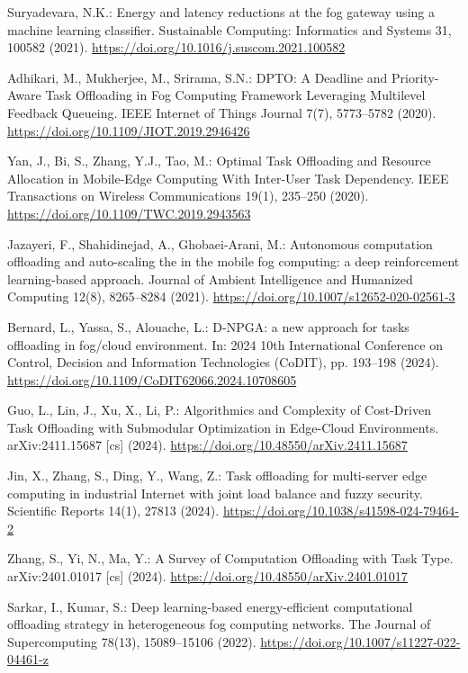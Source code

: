 \documentclass{svproc}
\begin{document}
\begin{thebibliography}{99}
Suryadevara, N.K.: Energy and latency reductions at the fog gateway using a machine learning classifier. Sustainable Computing: Informatics and Systems 31, 100582 (2021). \url{https://doi.org/10.1016/j.suscom.2021.100582}

Adhikari, M., Mukherjee, M., Srirama, S.N.: DPTO: A Deadline and Priority-Aware Task Offloading in Fog Computing Framework Leveraging Multilevel Feedback Queueing. IEEE Internet of Things Journal 7(7), 5773--5782 (2020). \url{https://doi.org/10.1109/JIOT.2019.2946426}

Yan, J., Bi, S., Zhang, Y.J., Tao, M.: Optimal Task Offloading and Resource Allocation in Mobile-Edge Computing With Inter-User Task Dependency. IEEE Transactions on Wireless Communications 19(1), 235--250 (2020). \url{https://doi.org/10.1109/TWC.2019.2943563}

Jazayeri, F., Shahidinejad, A., Ghobaei-Arani, M.: Autonomous computation offloading and auto-scaling the in the mobile fog computing: a deep reinforcement learning-based approach. Journal of Ambient Intelligence and Humanized Computing 12(8), 8265--8284 (2021). \url{https://doi.org/10.1007/s12652-020-02561-3}

Bernard, L., Yassa, S., Alouache, L.: D-NPGA: a new approach for tasks offloading in fog/cloud environment. In: 2024 10th International Conference on Control, Decision and Information Technologies (CoDIT), pp. 193--198 (2024). \url{https://doi.org/10.1109/CoDIT62066.2024.10708605}

Guo, L., Lin, J., Xu, X., Li, P.: Algorithmics and Complexity of Cost-Driven Task Offloading with Submodular Optimization in Edge-Cloud Environments. arXiv:2411.15687 [cs] (2024). \url{https://doi.org/10.48550/arXiv.2411.15687}

Jin, X., Zhang, S., Ding, Y., Wang, Z.: Task offloading for multi-server edge computing in industrial Internet with joint load balance and fuzzy security. Scientific Reports 14(1), 27813 (2024). \url{https://doi.org/10.1038/s41598-024-79464-2}

Zhang, S., Yi, N., Ma, Y.: A Survey of Computation Offloading with Task Type. arXiv:2401.01017 [cs] (2024). \url{https://doi.org/10.48550/arXiv.2401.01017}

Sarkar, I., Kumar, S.: Deep learning-based energy-efficient computational offloading strategy in heterogeneous fog computing networks. The Journal of Supercomputing 78(13), 15089--15106 (2022). \url{https://doi.org/10.1007/s11227-022-04461-z}


\end{thebibliography}
\end{document}
